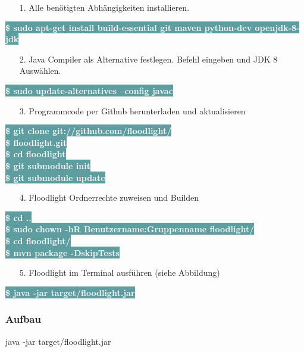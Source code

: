 \documentclass[fontsize=12pt,paper=a4,open=any,parskip=half,
  twoside=false,toc=listof,toc=bibliography,fleqn,leqno,
  captions=nooneline,captions=tableabove,british]{scrbook}
\begin{document}
\begin{itemize}
\item[1.] Alle benötigten Abhängigkeiten installieren.
\end{itemize}
\colorbox{CadetBlue}{\textcolor{white}{\textbf{\textsf{\$ sudo apt-get install build-essential git maven python-dev openjdk-8-jdk}}}}
\begin{itemize}
\item[2.] Java Compiler als Alternative festlegen. Befehl eingeben und JDK 8 Auswählen.
\end{itemize}
\colorbox{CadetBlue}{\textcolor{white}{\textbf{\textsf{\$ sudo update-alternatives --config javac}}}}
\begin{itemize}
\item[3.] Programmcode per Github herunterladen und aktualisieren
\end{itemize}
\colorbox{CadetBlue}{\textcolor{white}{\textbf{\textsf{\$ git clone git://github.com/floodlight/}}}}\\
\colorbox{CadetBlue}{\textcolor{white}{\textbf{\textsf{\$ floodlight.git}}}}\\
\colorbox{CadetBlue}{\textcolor{white}{\textbf{\textsf{\$ cd floodlight}}}}\\
\colorbox{CadetBlue}{\textcolor{white}{\textbf{\textsf{\$ git submodule init}}}}\\
\colorbox{CadetBlue}{\textcolor{white}{\textbf{\textsf{\$ git submodule update}}}}
\begin{itemize}
\item[4.] Floodlight Ordnerrechte zuweisen und Builden
\end{itemize}
\colorbox{CadetBlue}{\textcolor{white}{\textbf{\textsf{\$ cd ..}}}}\\
\colorbox{CadetBlue}{\textcolor{white}{\textbf{\textsf{\$ sudo chown -hR Benutzername:Gruppenname floodlight/}}}}\\
\colorbox{CadetBlue}{\textcolor{white}{\textbf{\textsf{\$ cd floodlight/}}}}\\
\colorbox{CadetBlue}{\textcolor{white}{\textbf{\textsf{\$ mvn package -DskipTests}}}}
\begin{itemize}
\item[5.] Floodlight im Terminal ausführen (siehe Abbildung)
\end{itemize}
\colorbox{CadetBlue}{\textcolor{white}{\textbf{\textsf{\$ java -jar target/floodlight.jar}}}}



\subsubsection{Aufbau}
java -jar target/floodlight.jar
\end{document}
